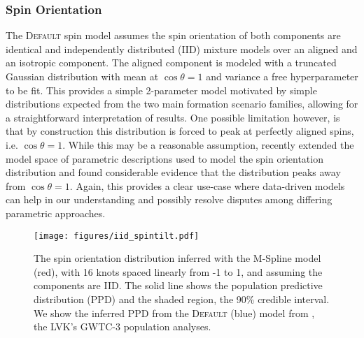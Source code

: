 \subsubsection{Spin Orientation}

The \textsc{Default} spin model assumes the spin orientation of both components are identical and independently distributed (IID) mixture models over an
aligned and an isotropic component. The aligned component is modeled with a truncated Gaussian distribution with mean at $\cos{\theta}=1$ and variance a free 
hyperparameter to be fit. This provides a simple 2-parameter model motivated by simple distributions expected from the two main formation scenario families, allowing 
for a straightforward interpretation of results. One possible limitation however, is that by construction this distribution is forced to peak at perfectly aligned spins, 
i.e. $\cos{\theta}=1$. While this may be a reasonable assumption, \citet{spinitasyoulike} recently extended the model space of parametric descriptions 
used to model the spin orientation distribution and found considerable evidence that the distribution peaks away from $\cos{\theta}=1$. Again, this provides a clear 
use-case where data-driven models can help in our understanding and possibly resolve disputes among differing parametric approaches.

\begin{figure}
    \begin{centering}
        \texttt{[image: figures/iid\_spintilt.pdf]}
        \caption{The spin orientation distribution inferred with the M-Spline model (red), with 16 knots spaced linearly from -1 to 1, and 
        assuming the components are IID. The solid line shows the population predictive distribution (PPD) and the shaded region, the 90\% credible interval. 
        We show the inferred PPD from the \textsc{Default} (blue) model from \citet{o3b_astro_dist}, the LVK's GWTC-3 population analyses.}
        \label{fig:iid_spintilt_dist}
    \end{centering}
\end{figure}

